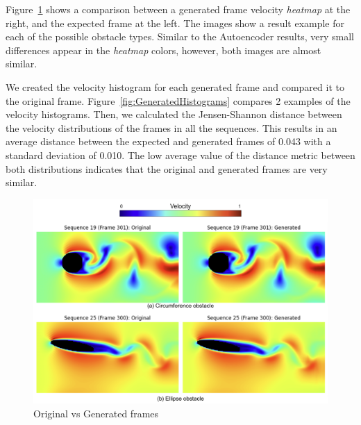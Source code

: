Figure~\ref{fig:GeneratedFrames} shows a comparison between a generated frame velocity \textit{heatmap} at the right, and the expected frame at the left. The images show a result example for each of the possible obstacle types. Similar to the Autoencoder results, very small differences appear in the \textit{heatmap} colors, however, both images are almost similar.

We created the velocity histogram for each generated frame and compared it to the original frame. Figure~\ref{fig:GeneratedHistograms} compares 2 examples of the velocity histograms. Then, we calculated the Jensen-Shannon distance between the velocity distributions of the frames in all the sequences. This results in an average distance between the expected and generated frames of 0.043 with a standard deviation of 0.010. The low average value of the distance metric between both distributions indicates that the original and generated frames are very similar.

\begin{figure}[!htbp]
    \centering
    \includegraphics[width=1\linewidth]{images/generator_frames.png}
    \caption{Original vs Generated frames}
    \label{fig:GeneratedFrames}
\end{figure}

